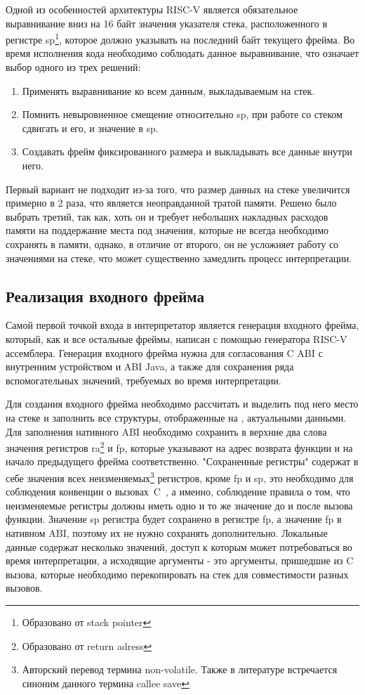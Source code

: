     Одной из особенностей архитектуры RISC-V является обязательное выравнивание вниз на 16 байт значения указателя стека, расположенного в регистре sp\footnote{Образовано от stack pointer}, которое должно указывать на последний байт текущего фрейма. Во время исполнения кода необходимо соблюдать данное выравнивание, что означает выбор одного из трех решений:
\begin{enumerate}
    \item Применять выравнивание ко всем данным, выкладываемым на стек.
    \item Помнить невыровненное смещение относительно sp, при работе со стеком сдвигать и его, и значение в sp.
    \item Создавать фрейм фиксированного размера и выкладывать все данные внутри него.
\end{enumerate}

Первый вариант не подходит из-за того, что размер данных на стеке увеличится примерно в 2 раза, что является неоправданной тратой памяти. Решено было выбрать третий, так как, хоть он и требует небольших накладных расходов памяти на поддержание места под значения, которые не всегда необходимо сохранять в памяти, однако, в отличие от второго, он не усложняет работу со значениями на стеке, что может существенно замедлить процесс интерпретации.

\subsection{Реализация входного фрейма}

Самой первой точкой входа в интерпретатор является генерация входного фрейма, который, как и все остальные фреймы, написан с помощью генератора RISC-V ассемблера. Генерация входного фрейма нужна для согласования C ABI с внутренним устройством и ABI Java, а также для сохранения ряда вспомогательных значений, требуемых во время интерпретации.

Для создания входного фрейма необходимо рассчитать и выделить под него место на стеке и заполнить все структуры, отображенные на , актуальными данными. Для заполнения нативного ABI необходимо сохранить в верхние два слова значения регистров ra\footnote{Образовано от return adress} и fp, которые указывают на адрес возврата функции и на начало предыдущего фрейма соответственно. "Сохраненные регистры" содержат в себе значения всех неизменяемых\footnote{Авторский перевод термина non-volatile. Также в литературе встречается синоним данного термина callee save} регистров, кроме fp и sp, это необходимо для соблюдения конвенции о вызовах~C~\cite{riscv:convention}, а именно, соблюдение правила о том, что неизменяемые регистры должны иметь одно и то же значение до и после вызова функции. Значение sp регистра будет сохранено в регистре fp, а значение fp в нативном ABI, поэтому их не нужно сохранять дополнительно. Локальные данные содержат несколько значений, доступ к которым может потребоваться во время интерпретации, а исходящие аргументы - это аргументы, пришедшие из C вызова, которые необходимо перекопировать на стек для совместимости разных вызовов.
 
